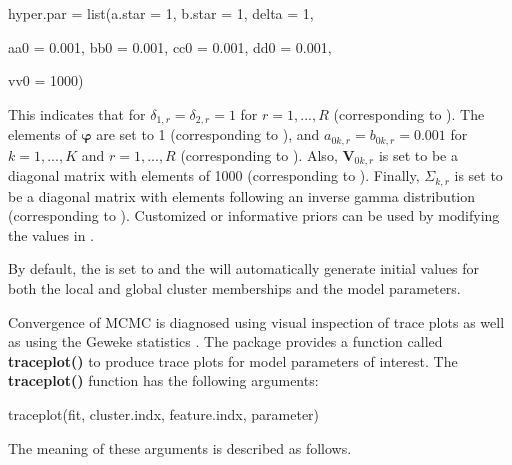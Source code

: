 \begin{example}

hyper.par = list(a.star = 1, b.star = 1, delta = 1, 

		       aa0 = 0.001, bb0 = 0.001, cc0 = 0.001, dd0 = 0.001,  

			  vv0 = 1000)

\end{example}

This indicates that for $\delta_{1,r} = \delta_{2,r} = 1$ for $r = 1,...,R$ (corresponding to ). The elements of $\boldsymbol{\varphi}$ are set to 1 (corresponding to ), and $a_{0k,r} = b_{0k,r} = 0.001 $ for $k = 1,...,K$ and $r = 1,...,R$ (corresponding to ).  Also, $\boldsymbol{V}_{0k,r}$ is set to be a diagonal matrix with elements of 1000 (corresponding to ). Finally, $\Sigma_{k,r}$ is set to be a diagonal matrix with elements following an inverse gamma distribution (corresponding to ). Customized or informative priors can be used by modifying the values in .

By default, the  is set to  and the  will automatically generate initial values for both the local and global cluster memberships and the model parameters. 

Convergence of MCMC is diagnosed using visual inspection of trace plots as well as using the Geweke statistics \citep{Geweke1991}. The  package provides a function called \textbf{traceplot()} to produce trace plots for model parameters of interest. The \textbf{traceplot()} function has the following arguments: 

\begin{example}

traceplot(fit, cluster.indx, feature.indx, parameter)

\end{example}

The meaning of these arguments is described as follows. 

